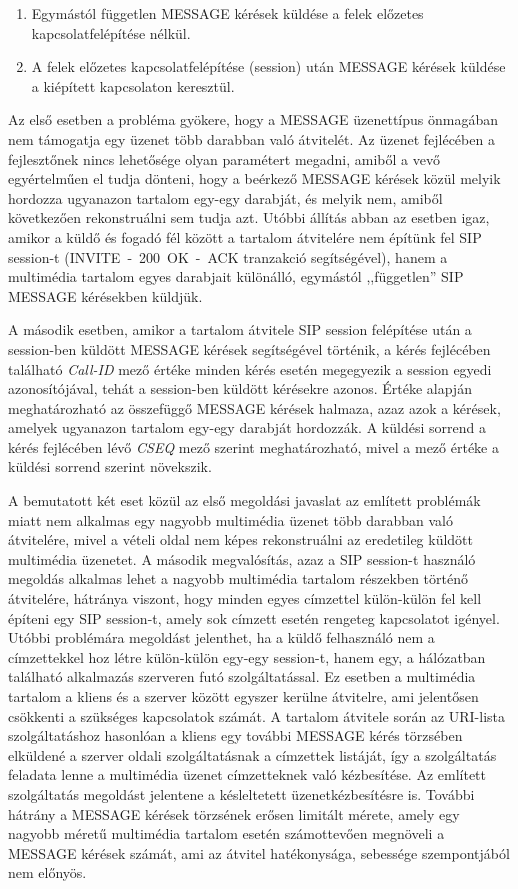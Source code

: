 \begin{enumerate}\itemsep1pt
\item	Egymástól független MESSAGE kérések küldése a felek előzetes kapcsolatfelépítése nélkül.
\item A felek előzetes kapcsolatfelépítése (session) után MESSAGE kérések küldése a kiépített kapcsolaton keresztül. 
\end{enumerate}

Az első esetben a probléma gyökere, hogy a MESSAGE üzenettípus önmagában nem támogatja egy üzenet több darabban való átvitelét. Az üzenet fejlécében a fejlesztőnek nincs lehetősége olyan paramétert megadni, amiből a vevő egyértelműen el tudja dönteni, hogy a beérkező MESSAGE kérések közül melyik hordozza ugyanazon tartalom egy-egy darabját, és melyik nem, amiből következően rekonstruálni sem tudja azt. Utóbbi állítás abban az esetben igaz, amikor a küldő és fogadó fél között a tartalom átvitelére nem építünk fel SIP session-t (INVITE~-~200~OK~-~ACK tranzakció segítségével), hanem a multimédia tartalom egyes darabjait különálló, egymástól ,,független'' SIP MESSAGE kérésekben küldjük. 

A második esetben, amikor a tartalom átvitele SIP session felépítése után a session-ben küldött MESSAGE kérések segítségével történik, a kérés fejlécében található \emph{Call-ID} mező értéke minden kérés esetén megegyezik a session egyedi azonosítójával, tehát a session-ben küldött kérésekre azonos. Értéke alapján meghatározható az összefüggő MESSAGE kérések halmaza, azaz azok a kérések, amelyek ugyanazon tartalom egy-egy darabját hordozzák. A küldési sorrend a kérés fejlécében lévő \emph{CSEQ} mező szerint meghatározható, mivel a mező értéke a küldési sorrend szerint növekszik. 

A bemutatott két eset közül az első megoldási javaslat az említett problémák miatt nem alkalmas egy nagyobb multimédia üzenet több darabban való átvitelére, mivel a vételi oldal nem képes rekonstruálni az eredetileg küldött multimédia üzenetet. A második megvalósítás, azaz a SIP session-t használó megoldás alkalmas lehet a nagyobb multimédia tartalom részekben történő átvitelére, hátránya viszont, hogy minden egyes címzettel külön-külön fel kell építeni egy SIP session-t, amely sok címzett esetén rengeteg kapcsolatot igényel. Utóbbi problémára megoldást jelenthet, ha a küldő felhasználó nem a címzettekkel hoz létre külön-külön egy-egy session-t, hanem egy, a hálózatban található alkalmazás szerveren futó szolgáltatással. Ez esetben a multimédia tartalom a kliens és a szerver között egyszer kerülne átvitelre, ami jelentősen csökkenti a szükséges kapcsolatok számát. A tartalom átvitele során az URI-lista szolgáltatáshoz hasonlóan a kliens egy további MESSAGE kérés törzsében elküldené a szerver oldali szolgáltatásnak a címzettek listáját, így a szolgáltatás feladata lenne a multimédia üzenet címzetteknek való kézbesítése. Az említett szolgáltatás megoldást jelentene a késleltetett üzenetkézbesítésre is. További hátrány a MESSAGE kérések törzsének erősen limitált mérete, amely egy nagyobb méretű multimédia tartalom esetén számottevően megnöveli a MESSAGE kérések számát, ami az átvitel hatékonysága, sebessége szempontjából nem előnyös.

